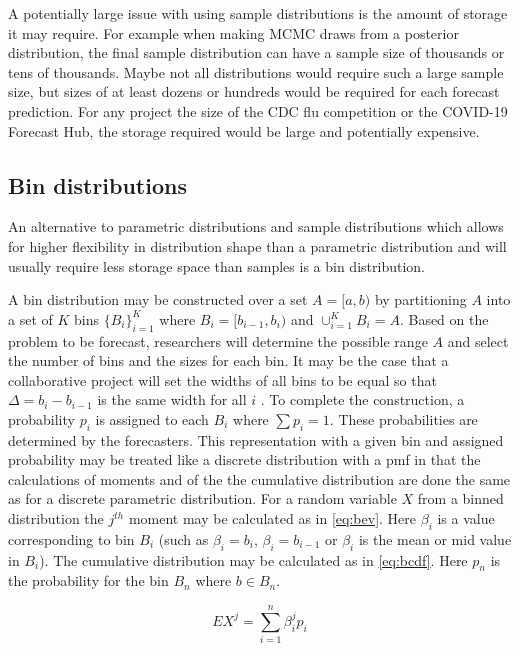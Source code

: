 \documentclass[11pt,notitlepage]{isuthesis}
\begin{document}
A potentially large issue with using sample distributions is the amount of 
storage
it may require. For example when making MCMC draws from a posterior 
distribution, the final sample distribution can have a sample size of thousands
or tens of thousands. Maybe not all distributions would require such a large 
sample size, but sizes of at least dozens or hundreds would be required for each
forecast prediction. For any project the size of the CDC flu competition or the
COVID-19 Forecast Hub, the storage required would be large and potentially 
expensive.

\subsection{Bin distributions}
An alternative to parametric distributions and sample distributions which allows
for higher flexibility in distribution shape than a parametric distribution and 
will usually require less storage space than samples is a bin 
distribution.

A bin distribution may be constructed over a set 
$A = [a, b)$ by partitioning $A$ into a set of $K$ bins $\{B_i\}_{i=1}^{K}$
where $B_i = [b_{i-1}, b_i)$ and $\cup_{i=1}^{K} B_i = A$. Based on the problem
to be forecast, researchers will determine the possible range $A$ and 
select the number of bins and the sizes for each bin. It may be the case
that a collaborative project will set the widths of all bins to be equal so that 
$\Delta = b_i - b_{i-1}$ is the same width for all $i$ 
\cite[]{mcgowan2019collaborative}.
To complete the construction, a probability $p_i$ is assigned to each $B_i$ 
where $\sum p_i = 1$. These probabilities are determined by the 
forecasters. 
This representation with a given bin and assigned probability may be 
treated like a discrete distribution with a pmf in that the calculations of 
moments and of the 
the cumulative distribution are done the same as for a discrete parametric 
distribution. For a random variable $X$ from a binned distribution 
the $j^{th}$ moment may be calculated as in \eqref{eq:bev}. 
Here $\beta_i$ is a value corresponding to bin $B_i$ (such as $\beta_i = b_i$,
$\beta_i = b_{i-1}$ or $\beta_i$ is the mean or mid value in $B_i$). The 
cumulative distribution may be calculated as in \eqref{eq:bcdf}.
Here $p_n$ is the probability for the bin $B_n$ where $b \in B_n$.

\begin{equation}
\label{eq:bev}
  EX^j = \sum_{i=1}^n \beta_i^j p_i
\end{equation}
\end{document}
